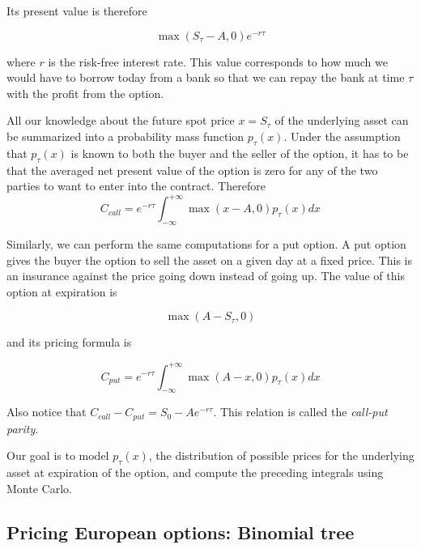 \documentclass[justified, sixbynine]{tufte-book}
\theoremstyle{plain}%
\newtheorem * {corollary}{Corollary}
\theoremstyle{definition}
\theoremstyle{remark}
\newtheorem * {remark}{Remark}
\newtheorem * {note}{Note}
\begin{document}
\begin{fullwidth}
Its present value is therefore

\begin{equation}
\max (S_\tau -A, 0) e^{-r\tau}
\end{equation}

where $r$ is the risk-free interest rate. This value corresponds to how much we would have to borrow today from a bank so that we can repay the bank at time $\tau$ with the profit from the option.

All our knowledge about the future spot price $x=S_\tau $ of the underlying
asset can be summarized into a probability mass function $p_\tau (x)$. Under
the assumption that $p_\tau (x)$ is known to both the buyer and the seller
of the option, it has to be that the averaged net present value of the
option is zero for any of the two parties to want to enter into the contract.
Therefore
\begin{equation}
C_{call}=e^{-r\tau }\int_{-\infty }^{+\infty }\max (x-A, 0)p_\tau (x)dx
\label{call_option}
\end{equation}


Similarly, we can perform the same computations for a put option. A put option gives the buyer the option to sell the asset on a given day at a fixed price. This is an insurance against the price going down instead of going up. The value of this option at expiration is

\begin{equation}
\max (A-S_\tau, 0)
\end{equation}

and its pricing formula is

\begin{equation}
C_{put}=e^{-r\tau }\int_{-\infty }^{+\infty }\max (A-x, 0)p_\tau (x)dx
\label{put_option}
\end{equation}

Also notice that $C_{call}-C_{put} = S_0 - A e^{-r\tau }$.
This relation is called the {\it call-put parity}.

Our goal is to model $p_\tau(x)$, the distribution of possible prices for the underlying asset at expiration of the option, and compute the preceding integrals using Monte Carlo.

\goodbreak\subsection{Pricing European options: Binomial tree}


\end{fullwidth}
\end{document}
